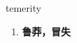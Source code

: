 
\begin{frame}
{\huge temerity}
\begin{center}
\begin{enumerate}\Large
  \item \textbf{鲁莽，冒失}
\end{enumerate}
\end{center}
\end{frame}

